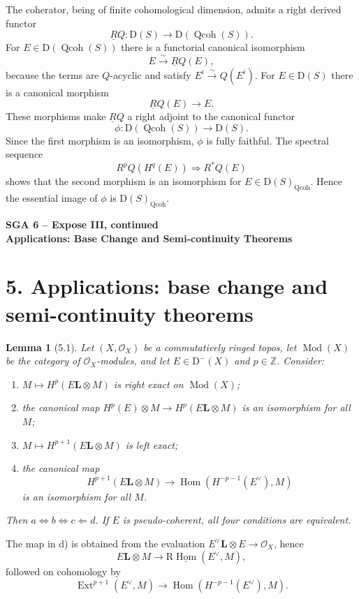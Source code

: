 \documentclass[13pt]{extarticle}
\newcommand{\ZZ}{\mathbb Z}
\newcommand{\cO}{\mathcal O}
\newcommand{\D}{\mathrm D}
\newcommand{\Qcoh}{\operatorname{Qcoh}}
\newcommand{\Mod}{\operatorname{Mod}}
\newcommand{\Hom}{\operatorname{Hom}}
\newcommand{\Ext}{\operatorname{Ext}}
\newcommand{\Ltens}{\mathbin{\mathbf L\!\otimes}}
\newcommand{\RHom}{\mathrm R\underline{\operatorname{Hom}}}
\newcommand{\iso}{\xrightarrow{\sim}}
\newtheorem*{lemma*}{Lemma}
\begin{document}
The coherator, being of finite cohomological dimension, admits a right derived functor
\[
\underline RQ:\D(S)\longrightarrow\D(\Qcoh(S)).
\]
For $E\in\D(\Qcoh(S))$ there is a functorial canonical isomorphism
\[
E\iso \underline RQ(E),
\]
because the terms are $Q$-acyclic and satisfy $E^i\iso Q(E^i)$. For $E\in\D(S)$ there is a canonical morphism
\[
\underline RQ(E)\longrightarrow E.
\]
These morphisms make $\underline RQ$ a right adjoint to the canonical functor
\[
\phi:\D(\Qcoh(S))\longrightarrow\D(S).
\]
Since the first morphism is an isomorphism, $\phi$ is fully faithful. The spectral sequence
\[
R^pQ(H^q(E))\Rightarrow R^*Q(E)
\]
shows that the second morphism is an isomorphism for $E\in\D(S)_{\Qcoh}$. Hence the essential image of $\phi$ is $\D(S)_{\Qcoh}$.

\newpage
\begin{center}
{\Large\textbf{SGA 6 -- Expose III, continued}}\\[0.35em]
{\large\textbf{Applications: Base Change and Semi-continuity Theorems}}
\end{center}

\section*{5. Applications: base change and semi-continuity theorems}

\begin{lemma*}[5.1]
Let $(X,\cO_X)$ be a commutatively ringed topos, let $\Mod(X)$ be the category of $\cO_X$-modules, and let $E\in\D^-(X)$ and $p\in\ZZ$. Consider:
\begin{enumerate}[label=\alph*)]
\item $M\mapsto H^p(E\Ltens M)$ is right exact on $\Mod(X)$;
\item the canonical map $H^p(E)\otimes M\to H^p(E\Ltens M)$ is an isomorphism for all $M$;
\item $M\mapsto H^{p+1}(E\Ltens M)$ is left exact;
\item the canonical map
\[
H^{p+1}(E\Ltens M)\to \Hom(H^{-p-1}(E^\vee),M)
\]
is an isomorphism for all $M$.
\end{enumerate}
Then $a\Leftrightarrow b\Leftrightarrow c\Leftarrow d$. If $E$ is pseudo-coherent, all four conditions are equivalent.
\end{lemma*}

The map in d) is obtained from the evaluation $E^\vee\Ltens E\to\cO_X$, hence
\[
E\Ltens M\to\RHom(E^\vee,M),
\]
followed on cohomology by
\[
\Ext^{p+1}(E^\vee,M)\to\Hom(H^{-p-1}(E^\vee),M).
\]
\end{document}
